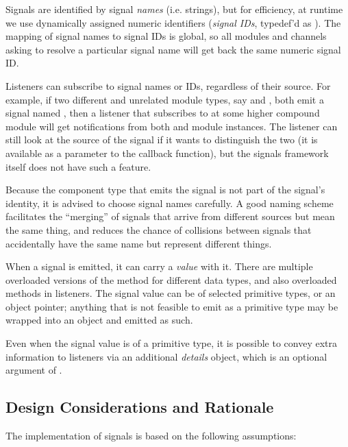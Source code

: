 Signals are identified by signal \textit{names} (i.e. strings), but for efficiency,
at runtime we use dynamically assigned numeric identifiers (\textit{signal IDs},
typedef'd as ). The mapping of signal names to signal IDs is
global, so all modules and channels asking to resolve a particular signal name
will get back the same numeric signal ID.

Listeners can subscribe to signal names or IDs, regardless of their
source. For example, if two different and unrelated module types, say
 and , both emit a signal named , then
a listener that subscribes to  at some higher compound module
will get notifications from both  and  module
instances. The listener can still look at the source of the signal if it
wants to distinguish the two (it is available as a parameter to the
callback function), but the signals framework itself does not have such a
feature.

\begin{note}
  Because the component type that emits the signal is not part of the signal's
  identity, it is advised to choose signal names carefully. A good naming scheme
  facilitates the ``merging'' of signals that arrive from different sources but
  mean the same thing, and reduces the chance of collisions between signals that
  accidentally have the same name but represent different things.
\end{note}

When a signal is emitted, it can carry a \textit{value} with it. There are
multiple overloaded versions of the  method for different
data types, and also overloaded  methods in
listeners. The signal value can be of selected primitive types, or an
object pointer; anything that is not feasible to emit as a primitive type
may be wrapped into an object and emitted as such.

Even when the signal value is of a primitive type, it is possible to convey
extra information to listeners via an additional \textit{details} object,
which is an optional argument of .

\subsection{Design Considerations and Rationale}
\label{sec:simple-modules:signals-design}

The implementation of signals is based on the following assumptions:

